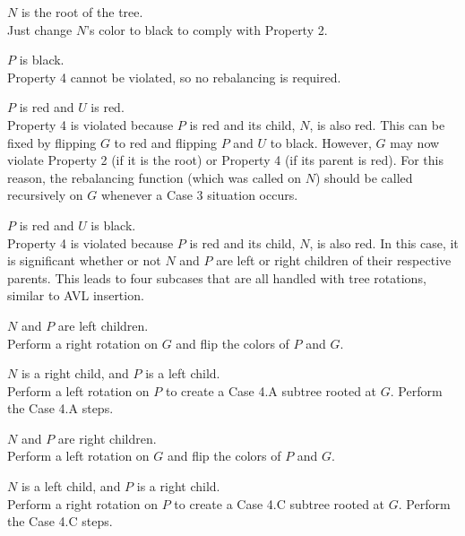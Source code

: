 \begin{description}[1cm]
    \item[\underline{Case 1}:] $N$ is the root of the tree. \\ 
    Just change $N$'s color to black to comply with Property 2. \\
    
    \item[\underline{Case 2}:] $P$ is black. \\ 
    Property 4 cannot be violated, so no rebalancing is required. \\
    
    \item[\underline{Case 3}:] $P$ is red and $U$ is red. \\ 
    Property 4 is violated because $P$ is red and its child, $N$, is also red. This can be fixed by flipping $G$ to red and flipping $P$ and $U$ to black. However, $G$ may now violate Property 2 (if it is the root) or Property 4 (if its parent is red). For this reason, the rebalancing function (which was called on $N$) should be called recursively on $G$ whenever a Case 3 situation occurs. \\
    
    \item[\underline{Case 4}:] $P$ is red and $U$ is black. \\ 
    Property 4 is violated because $P$ is red and its child, $N$, is also red. In this case, it is significant whether or not $N$ and $P$ are left or right children of their respective parents. This leads to four subcases that are all handled with tree rotations, similar to AVL insertion. \\
    
    \begin{description}[1cm]
        \item[\underline{Case 4.A}:] $N$ and $P$ are left children. \\
        Perform a right rotation on $G$ and flip the colors of $P$ and $G$. \\
        
        \item[\underline{Case 4.B}:] $N$ is a right child, and $P$ is a left child. \\
        Perform a left rotation on $P$ to create a Case 4.A subtree rooted at $G$. Perform the Case 4.A steps. \\
        
        \item[\underline{Case 4.C}:] $N$ and $P$ are right children. \\
        Perform a left rotation on $G$ and flip the colors of $P$ and $G$. \\
        
        \item[\underline{Case 4.D}:] $N$ is a left child, and $P$ is a right child. \\
        Perform a right rotation on $P$ to create a Case 4.C subtree rooted at $G$. Perform the Case 4.C steps. \\
    \end{description}
\end{description}

